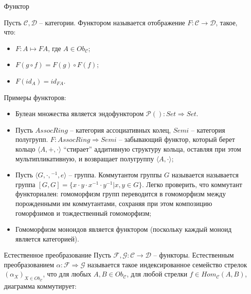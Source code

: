 \begin{defin} Функтор

  Пусть $\mathcal{C}, \mathcal{D}$ -- категории. Функтором называется отображение $F : \mathcal{C} \to \mathcal{D}$, такое, что:
  \begin{itemize}
    \item $F : A \mapsto F A$, где $A \in Ob_{\mathcal{C}}$;
    \item $F (g \circ f) = F(g) \circ F(f)$;
    \item $F (id_A) = id_{F A}$.
  \end{itemize}
\end{defin}

Примеры функторов:
\begin{itemize}
  \item Булеан множества является эндофунктором $\mathcal{P}() : Set \Rightarrow Set$.
  \item Пусть $AssocRing$ -- категория ассоциативных колец, $Semi$ -- категория полугрупп.
$F : AssocRing \Rightarrow Semi$ -- забывающий функтор, который берет кольцо $\langle A, +, \cdot \rangle$ ``стирает'' аддитивную структуру кольца, оставляя при этом мультипликативную, и возвращает
полугруппу $\langle A, \cdot \rangle$;
  \item Пусть $\langle G, \cdot, {}^{-1}, e \rangle$ -- группа. Коммутантом группы $G$ называется называется группа $[G,G] = \{ x \cdot y \cdot x^{-1} \cdot y^{-1} | x, y \in G \}$.
Легко проверить, что коммутант функториален: гомоморфизм групп переводится в гомоморфизм между порожденными им коммутантами, сохраняя при этом композицию гоморфзимов и тождественный гомоморфизм;
  \item Гомоморфизм моноидов является функтором (поскольку каждый моноид является категорией).
\end{itemize}

\begin{defin} Естественное преобразование
  Пусть $\mathcal{F}, \mathcal{G} : \mathcal{C} \to \mathcal{D}$ -- функторы.
  Естественным преобразованием $\alpha : \mathcal{F} \Rightarrow \mathcal{G}$ называется такое индексированное семейство стрелок $(\alpha_{X})_{X \in Ob_{\mathcal{C}}}$,
что для любых $A, B \in Ob_{\mathcal{C}}$, для любой стрелки $f \in Hom_{\mathcal{C}}(A, B)$, диаграмма коммутирует:

\end{defin}

